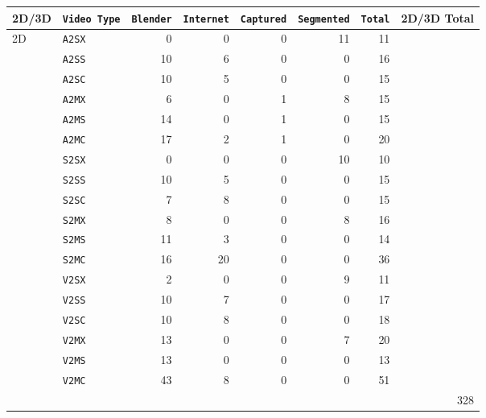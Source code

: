 \begin{table}[t]
\centering
\small
\renewcommand{\arraystretch}{1.1}
\begin{tabular}{l | l r r r r r r}
\toprule
2D/3D & \texttt{Video Type} & \texttt{Blender} & \texttt{Internet} & \texttt{Captured} & \texttt{Segmented} & \texttt{Total} & 2D/3D Total \\
\midrule

2D & \texttt{A2SX} & 0 & 0 & 0 & 11 & 11 &  \\
   & \texttt{A2SS} & 10 & 6 & 0 & 0  & 16 &  \\
   & \texttt{A2SC} & 10 & 5 & 0 & 0  & 15 &  \\
   & \texttt{A2MX} & 6 & 0 & 1 & 8  & 15 &  \\
   & \texttt{A2MS} & 14 & 0 & 1 & 0 & 15 &  \\
   & \texttt{A2MC} & 17 & 2 & 1 & 0 & 20 &  \\
   & \texttt{S2SX} & 0 & 0 & 0 & 10 & 10 & \\
   & \texttt{S2SS} & 10 & 5 & 0 & 0 & 15 & \\
   & \texttt{S2SC} & 7 & 8 & 0 & 0 & 15 & \\
   & \texttt{S2MX} & 8 & 0 & 0 & 8 & 16 & \\
   & \texttt{S2MS} & 11 & 3 & 0 & 0 & 14 & \\
   & \texttt{S2MC} & 16 & 20 & 0 & 0 & 36 & \\
   & \texttt{V2SX} & 2 & 0 & 0 & 9 & 11 & \\
   & \texttt{V2SS} & 10 & 7 & 0 & 0 & 17 & \\
   & \texttt{V2SC} & 10 & 8 & 0 & 0 & 18 & \\
   & \texttt{V2MX} & 13 & 0 & 0 & 7 & 20 & \\
   & \texttt{V2MS} & 13 & 0 & 0 & 0 & 13 & \\
   & \texttt{V2MC} & 43 & 8 & 0 & 0 & 51 & \\
\hline
   &       &   &   &   &   &    & 328 \\
\midrule


\end{tabular}
\end{table}
